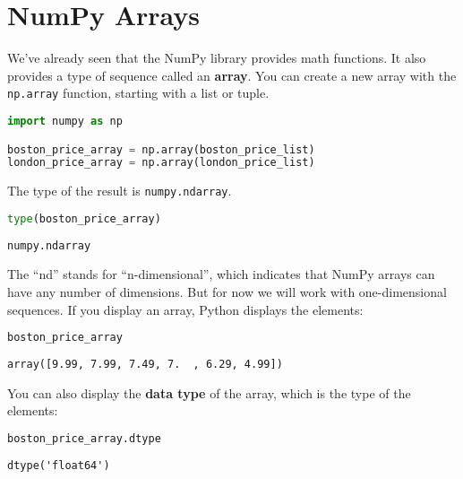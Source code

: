 \hypertarget{numpy-arrays}{%
\section{NumPy Arrays}\label{numpy-arrays}}

We've already seen that the NumPy library provides math functions. It
also provides a type of sequence called an \textbf{array}. You can
create a new array with the \passthrough{\lstinline!np.array!} function,
starting with a list or tuple.

\begin{lstlisting}[language=Python,style=source]
import numpy as np

boston_price_array = np.array(boston_price_list)
london_price_array = np.array(london_price_list)
\end{lstlisting}

The type of the result is \passthrough{\lstinline!numpy.ndarray!}.

\begin{lstlisting}[language=Python,style=source]
type(boston_price_array)
\end{lstlisting}

\begin{lstlisting}[style=output]
numpy.ndarray
\end{lstlisting}

The ``nd'' stands for ``n-dimensional'', which indicates that NumPy
arrays can have any number of dimensions. But for now we will work with
one-dimensional sequences. If you display an array, Python displays the
elements:

\begin{lstlisting}[language=Python,style=source]
boston_price_array
\end{lstlisting}

\begin{lstlisting}[style=output]
array([9.99, 7.99, 7.49, 7.  , 6.29, 4.99])
\end{lstlisting}

You can also display the \textbf{data type} of the array, which is the
type of the elements:

\begin{lstlisting}[language=Python,style=source]
boston_price_array.dtype
\end{lstlisting}

\begin{lstlisting}[style=output]
dtype('float64')
\end{lstlisting}


